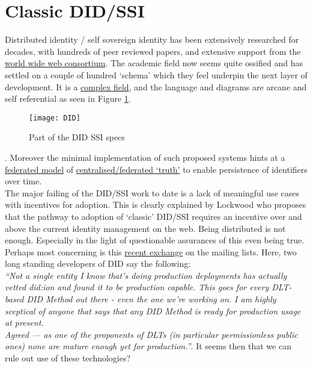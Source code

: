 \section{Classic DID/SSI}
Distributed identity / self sovereign identity has been extensively researched for decades, with hundreds of peer reviewed papers, and extensive support from the \href{https://www.w3.org/TR/did-core/}{world wide web consortium}. The academic field now seems quite ossified and has settled on a couple of hundred `schema' which they feel underpin the next layer of development. It is a \href{https://medium.com/decentralized-identity/overview-of-decentralized-identity-standards-f82efd9ab6c7}{complex field}, and the language and diagrams are arcane and self referential as seen in Figure \ref{fig:DID}.
\begin{figure}
\texttt{[image: DID]}
  \caption{Part of the DID SSI specs}
  \label{fig:DID}
\end{figure}. 
Moreover the minimal implementation of such proposed systems hints at a \href{https://www.w3.org/community/perma-id/}{federated model} of \href{https://github.com/w3c/vc-data-model/issues/947#issuecomment-1276186406}{centralised/federated `truth'} to enable persistence of identifiers over time.\\
The major failing of the DID/SSI work to date is a lack of meaningful use cases with incentives for adoption. This is clearly explained by Lockwood \cite{lockwood2021exploring} who proposes that the pathway to adoption of `classic' DID/SSI requires an incentive over and above the current identity management on the web. Being distributed is not enough. Especially in the light of questionable assurances of this even being true.\\
Perhaps most concerning is this \href{https://lists.w3.org/Archives/Public/public-credentials/2022Mar/thread.html}{recent exchange} on the mailing lists. Here, two long standing developers of DID say the following:\\
\textit{``Not a single entity I know that's doing production deployments has actually vetted did:ion and found it to be production capable. This goes for every DLT-based DID Method out there - even the one we're working on. I am highly sceptical of anyone that says that any DID Method is ready for production usage at present.\\
Agreed — as one of the proponents of DLTs (in particular permissionless public ones) none are mature enough yet for production.''}.
It seems then that we can rule out use of these technologies?

